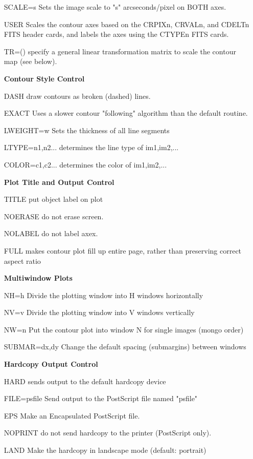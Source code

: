 \begin{itemize}
  \item[SCALE=s]{Sets the image scale to "s" arcseconds/pixel on BOTH axes.}
  \item[USER]{Scales the contour axes based on the CRPIXn, CRVALn,
       and CDELTn FITS header cards, and labels the axes using
       the CTYPEn FITS cards.}
  \item[TR=()]{specify a general linear transformation matrix to scale
       the contour map (see below).}
  \item[\textbf{Contour Style Control}\hfill]{}
  \item[DASH]{draw contours as broken (dashed) lines.}
  \item[EXACT]{Uses a slower contour "following" algorithm than the
       default routine.}
  \item[LWEIGHT=w]{Sets the thickness of all line segments}
  \item[LTYPE=n1,n2...]{determines the line type of im1,im2,...}
  \item[COLOR=c1,c2...]{determines the color of im1,im2,...}
  \item[\textbf{Plot Title and Output Control}\hfill]{}
  \item[TITLE]{put object label on plot}
  \item[NOERASE]{do not erase screen.}
  \item[NOLABEL ]{do not label axex.}
  \item[FULL ]{makes contour plot fill up entire page, rather
       than preserving correct aspect ratio}
  \item[\textbf{Multiwindow Plots}\hfill]{}
  \item[NH=h]{Divide the plotting window into H windows horizontally}
  \item[NV=v]{Divide the plotting window into V windows vertically}
  \item[NW=n]{Put the contour plot into window N for single images 
       (mongo order)}
  \item[SUBMAR=dx,dy]{Change the default spacing (submargins) between windows}
  \item[\textbf{Hardcopy Output Control}\hfill]{}
  \item[HARD]{sends output to the default hardcopy device}
  \item[FILE=psfile]{Send output to the PostScript file named "psfile"}
  \item[EPS]{Make an Encapsulated PostScript file.}
  \item[NOPRINT]{do not send hardcopy to the printer (PostScript only).}
  \item[LAND]{Make the hardcopy in landscape mode (default: portrait)}
\end{itemize}
 
